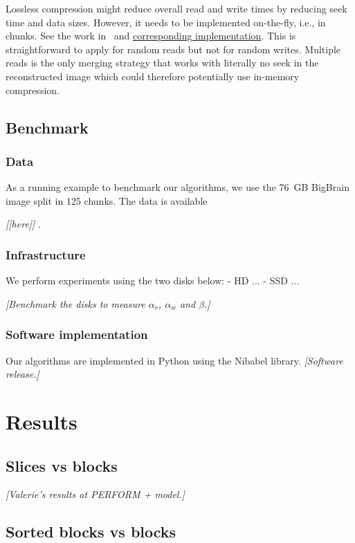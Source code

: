 \documentclass[10pt, conference, compsocconf]{IEEEtran}
\newcommand{\todo}[1]{
  \color{red}\emph{[#1]}
  \color{black}
}
\begin{document}
Lossless compression might reduce overall read and write times by
reducing seek time and data sizes. However, it needs to be implemented
on-the-fly, i.e., in chunks. See the work in~\cite{rajna2015speeding}
and
\href{https://github.com/pauldmccarthy/indexed\_gzip}{corresponding
  implementation}. This is straightforward to apply for random reads
but not for random writes. Multiple reads is the only merging strategy
that works with literally no seek in the reconstructed image which
could therefore potentially use in-memory compression.
     
\subsection{Benchmark}
\label{sec:benchmark}

\subsubsection{Data}
As a running example to benchmark our algorithms, we use the 76~GB
BigBrain image split in 125 chunks. The data is available
\todo{[here]}.

\subsubsection{Infrastructure}
 We
perform experiments using the two disks below:
- HD ...
- SSD ...

\todo{Benchmark the disks to measure $\alpha_r$, $\alpha_w$ and $\beta$.}

\subsubsection{Software implementation}

Our algorithms are implemented in Python using the Nibabel
library. \todo{Software release.}

\section{Results}
\label{sec:results}

\subsection{Slices vs blocks}

\todo{Valerie's results at PERFORM + model.}

\subsection{Sorted blocks vs blocks}
\end{document}
